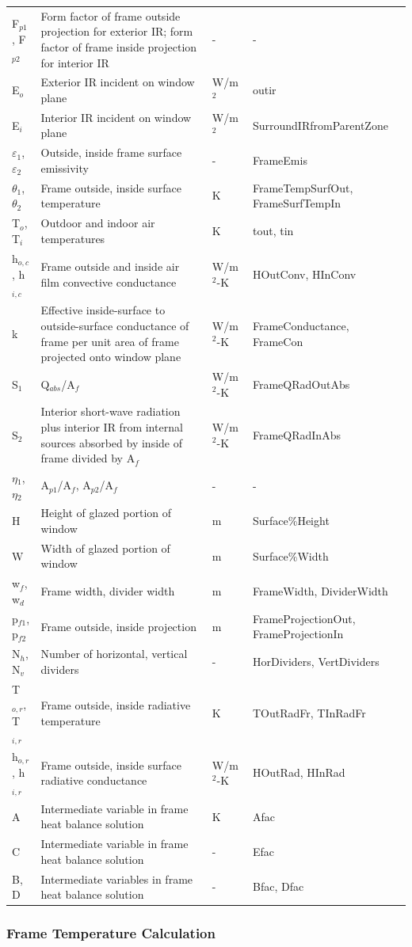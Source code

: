 \begin{longtable}[c]{p{1.0in}p{2.5in}p{1.0in}p{1.5in}}
F\(_{p1}\), F\(_{p2}\) & Form factor of frame outside projection for exterior IR; form factor of frame inside projection for interior IR & - & - \tabularnewline
E\(_{o}\) & Exterior IR incident on window plane & W/m\(^{2}\) & outir \tabularnewline
E\(_{i}\) & Interior IR incident on window plane & W/m\(^{2}\) & SurroundIRfromParentZone \tabularnewline
$\varepsilon$\(_{1}\), $\varepsilon$\(_{2}\) & Outside, inside frame surface emissivity & - & FrameEmis \tabularnewline
$\theta$\(_{1}\), $\theta$\(_{2}\) & Frame outside, inside surface temperature & K & FrameTempSurfOut, FrameSurfTempIn \tabularnewline
T\(_{o}\), T\(_{i}\) & Outdoor and indoor air temperatures & K & tout, tin \tabularnewline
h\(_{o,c}\), h\(_{i,c}\) & Frame outside and inside air film convective conductance & W/m\(^{2}\)-K & HOutConv, HInConv \tabularnewline
k & Effective inside-surface to outside-surface conductance of frame per unit area of frame projected onto window plane & W/m\(^{2}\)-K & FrameConductance, FrameCon \tabularnewline
S\(_{1}\) & Q\(_{abs}\)/A\(_{f}\) & W/m\(^{2}\)-K & FrameQRadOutAbs \tabularnewline
S\(_{2}\) & Interior short-wave radiation plus interior IR from internal sources absorbed by inside of frame divided by A\(_{f}\) & W/m\(^{2}\)-K & FrameQRadInAbs \tabularnewline
$\eta$\(_{1}\), $\eta$\(_{2}\) & A\(_{p1}\)/A\(_{f}\), A\(_{p2}\)/A\(_{f}\) & - & - \tabularnewline
H & Height of glazed portion of window & m & Surface\%Height \tabularnewline
W & Width of glazed portion of window & m & Surface\%Width \tabularnewline
w\(_{f}\), w\(_{d}\) & Frame width, divider width & m & FrameWidth, DividerWidth \tabularnewline
p\(_{f1}\), p\(_{f2}\) & Frame outside, inside projection & m & FrameProjectionOut, FrameProjectionIn \tabularnewline
N\(_{h}\), N\(_{v}\) & Number of horizontal, vertical dividers & - & HorDividers, VertDividers \tabularnewline
T\(_{o,r}\), T\(_{i,r}\) & Frame outside, inside radiative temperature & K & TOutRadFr, TInRadFr \tabularnewline
h\(_{o,r}\), h\(_{i,r}\) & Frame outside, inside surface radiative conductance & W/m\(^{2}\)-K & HOutRad, HInRad \tabularnewline
A & Intermediate variable in frame heat balance solution & K & Afac \tabularnewline
C & Intermediate variable in frame heat balance solution & - & Efac \tabularnewline
B, D & Intermediate variables in frame heat balance solution & - & Bfac, Dfac \tabularnewline
\bottomrule
\end{longtable}

\subsubsection{Frame Temperature Calculation}\label{frame-temperature-calculation}

